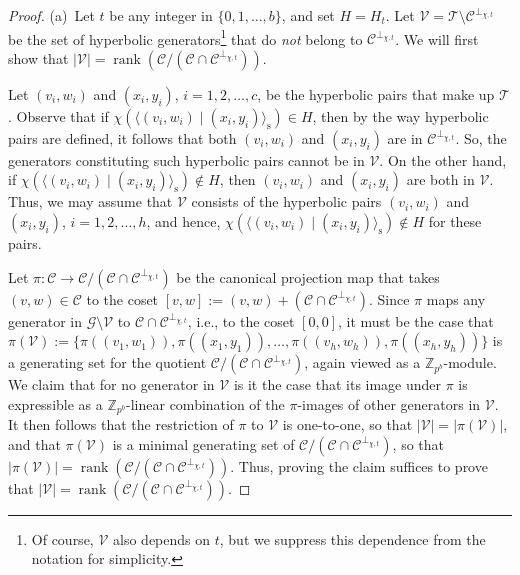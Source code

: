 \documentclass{article}
\DeclareMathOperator{\rank}{rank}
\theoremstyle{remark}
\theoremstyle{definition}
\numberwithin{equation}{section}
\begin{document}
\begin{proof}
(a)\ Let $t$ be any integer in $\{0,1,\ldots,b\}$, and set $H = H_t$. Let $\mathcal{V} = \mathcal{T} \setminus \mathcal{C}^{\perp_{\chi,t}}$ be the set of hyperbolic generators\footnote{Of course, $\mathcal{V}$ also depends on $t$, but we suppress this dependence from the notation for simplicity.} that do \emph{not} belong to $\mathcal{C}^{\perp_{\chi,t}}$. We will first show that $|\mathcal{V}| = \rank(\mathcal{C} / (\mathcal{C} \cap \mathcal{C}^{\perp_{\chi,t}}))$.

Let $(v_i,w_i)$ and $(x_i,y_i)$, $i=1,2,\ldots,c$, be the hyperbolic pairs that make up $\mathcal{T}$. Observe that if $\chi( \langle (v_i,w_i) \mid (x_i,y_i) \rangle_{\mathrm{s}}) \in H$, then by the way hyperbolic pairs are defined, it follows that both $(v_i,w_i)$ and $(x_i,y_i)$ are in $\mathcal{C}^{\perp_{\chi,t}}$. So, the generators constituting such hyperbolic pairs cannot be in $\mathcal{V}$. On the other hand, if $\chi( \langle (v_i,w_i) \mid (x_i,y_i) \rangle_{\mathrm{s}}) \notin H$, then $(v_i,w_i)$ and $(x_i,y_i)$ are both in $\mathcal{V}$. Thus, we may assume that $\mathcal{V}$ consists of the hyperbolic pairs $(v_i,w_i)$ and $(x_i,y_i)$, $i=1,2,\ldots,h$, and hence, $\chi( \langle (v_i,w_i) \mid (x_i,y_i) \rangle_{\mathrm{s}}) \notin H$ for these pairs.

Let $\pi : \mathcal{C}  \to \mathcal{C}/(\mathcal{C} \cap \mathcal{C}^{\perp_{\chi,t}})$ be the canonical projection map that takes $(v,w) \in \mathcal{C}$ to the coset $[v,w] := (v,w) + (\mathcal{C} \cap \mathcal{C}^{\perp_{\chi,t}})$. Since $\pi$ maps any generator in $\mathcal{G} \setminus \mathcal{V}$ to $\mathcal{C} \cap \mathcal{C}^{\perp_{\chi,t}}$, i.e., to the coset $[0,0]$, it must be the case that $\pi(\mathcal{V}) := \{\pi((v_1,w_1)), \pi((x_1,y_1)), \ldots, \pi((v_h,w_h)), \pi((x_h,y_h))\}$ is a generating set for the quotient $\mathcal{C} / (\mathcal{C} \cap \mathcal{C}^{\perp_{\chi,t}})$, again viewed as a $\mathbb{Z}_{p^b}$-module. We claim that for no generator in $\mathcal{V}$ is it the case that its image under $\pi$ is expressible as a $\mathbb{Z}_{p^b}$-linear combination of the $\pi$-images of other generators in $\mathcal{V}$. It then follows that the restriction of $\pi$ to $\mathcal{V}$ is one-to-one, so that $|\mathcal{V}| = |\pi(\mathcal{V})|$, and that $\pi(\mathcal{V})$ is a minimal generating set of $\mathcal{C} / (\mathcal{C} \cap \mathcal{C}^{\perp_{\chi,t}})$, so that $|\pi(\mathcal{V})| = \rank(\mathcal{C} / (\mathcal{C} \cap \mathcal{C}^{\perp_{\chi,t}}))$. Thus, proving the claim suffices to prove that $|\mathcal{V}| = \rank(\mathcal{C} / (\mathcal{C} \cap \mathcal{C}^{\perp_{\chi,t}}))$.


\end{proof}
\end{document}
